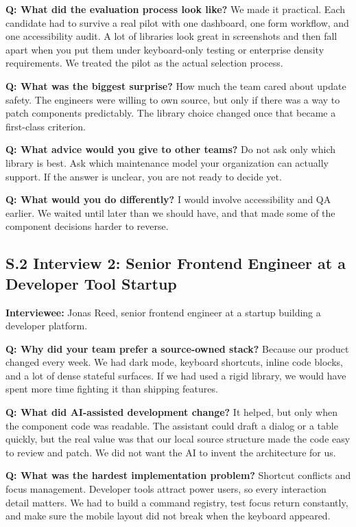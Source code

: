 \textbf{Q: What did the evaluation process look like?}
We made it practical. Each candidate had to survive a real pilot with one dashboard, one form workflow, and one accessibility audit. A lot of libraries look great in screenshots and then fall apart when you put them under keyboard-only testing or enterprise density requirements. We treated the pilot as the actual selection process.

\textbf{Q: What was the biggest surprise?}
How much the team cared about update safety. The engineers were willing to own source, but only if there was a way to patch components predictably. The library choice changed once that became a first-class criterion.

\textbf{Q: What advice would you give to other teams?}
Do not ask only which library is best. Ask which maintenance model your organization can actually support. If the answer is unclear, you are not ready to decide yet.

\textbf{Q: What would you do differently?}
I would involve accessibility and QA earlier. We waited until later than we should have, and that made some of the component decisions harder to reverse.

\subsection*{S.2 Interview 2: Senior Frontend Engineer at a Developer Tool Startup}
\textbf{Interviewee:} Jonas Reed, senior frontend engineer at a startup building a developer platform.

\textbf{Q: Why did your team prefer a source-owned stack?}
Because our product changed every week. We had dark mode, keyboard shortcuts, inline code blocks, and a lot of dense stateful surfaces. If we had used a rigid library, we would have spent more time fighting it than shipping features.

\textbf{Q: What did AI-assisted development change?}
It helped, but only when the component code was readable. The assistant could draft a dialog or a table quickly, but the real value was that our local source structure made the code easy to review and patch. We did not want the AI to invent the architecture for us.

\textbf{Q: What was the hardest implementation problem?}
Shortcut conflicts and focus management. Developer tools attract power users, so every interaction detail matters. We had to build a command registry, test focus return constantly, and make sure the mobile layout did not break when the keyboard appeared.


